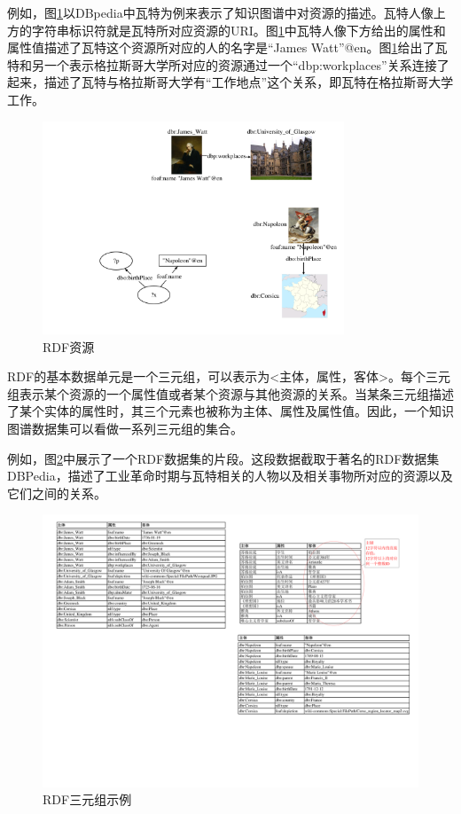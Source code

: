 例如，图\ref{fig:rdfresource}以DBpedia\cite{DBLP:DBpedia}中瓦特为例来表示了知识图谱中对资源的描述。瓦特人像上方的字符串标识符就是瓦特所对应资源的URI。图\ref{fig:rdfresource}中瓦特人像下方给出的属性和属性值描述了瓦特这个资源所对应的人的名字是“James Watt”@en。图\ref{fig:rdfresource}给出了瓦特和另一个表示格拉斯哥大学所对应的资源通过一个“dbp:workplaces”关系连接了起来，描述了瓦特与格拉斯哥大学有“工作地点”这个关系，即瓦特在格拉斯哥大学工作。

\begin{figure}[h]
\begin{center}
   \includegraphics[width=9cm]{./figures/part1/resource.pdf}
    \caption{RDF资源}
   \label{fig:rdfresource}
\end{center}
\end{figure}

RDF的基本数据单元是一个三元组，可以表示为<主体，属性，客体>。每个三元组表示某个资源的一个属性值或者某个资源与其他资源的关系。当某条三元组描述了某个实体的属性时，其三个元素也被称为主体、属性及属性值。因此，一个知识图谱数据集可以看做一系列三元组的集合。

例如，图\ref{fig:rdftriples}中展示了一个RDF数据集的片段。这段数据截取于著名的RDF数据集DBPedia\cite{DBLP:DBpedia}，描述了工业革命时期与瓦特相关的人物以及相关事物所对应的资源以及它们之间的关系。

\begin{figure}
\begin{center}
   \includegraphics[width=12cm]{./figures/part1/triples.pdf}
    \caption{RDF三元组示例}
   \label{fig:rdftriples}
\end{center}
\end{figure}


